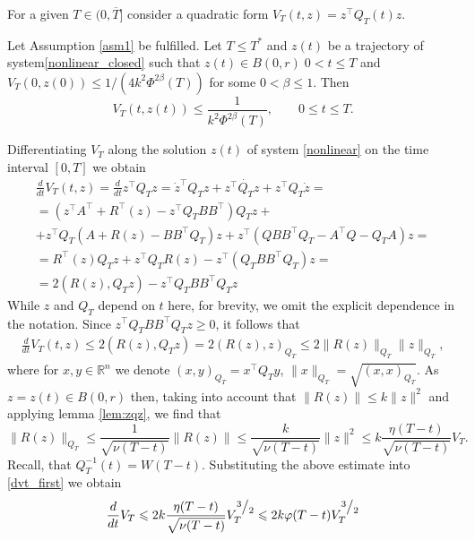\documentclass[../main.tex]{subfiles}
\begin{document}
For a given $T\in (0, \overline{T}]$ consider a quadratic form $V_T(t,z)=z^{\top}Q_T(t)z$.  
\begin{lemma}\label{lem:vest}
 Let Assumption \ref{asm1} be fulfilled. Let $T\leqslant T^*$ and $z(t)$ be a trajectory of system\eqref{nonlinear_closed} such that   $z(t)  \in B(0,r)\;0<t \leqslant T$ and $V_T(0,z(0))\leqslant 1/(4k^2\Phi^{2\beta}(T))$ for some $0<\beta \leqslant 1$. Then 
 $$V_T(t,z(t)) \leqslant \frac{1}{k^2\Phi^{2\beta}(T)}, \qquad 0 \leqslant t \leqslant T. $$
\end{lemma}
\doc
Differentiating $V_T$ along the solution $z(t)$ of  system \eqref{nonlinear}  on the time interval $[0, T]$ we obtain
\begin{gather*}
    \frac{d}{dt}V_T(t,z) = \frac{d}{dt}z^{\top}Q_Tz = \dot{z}^{\top} Q_T z + z^{\top} \dot{Q_T} z + z^{\top} Q_T \dot{z} = \\
    =\left(z^{\top} A^{\top} + R^{\top}(z)- z^{\top} Q_T B B^{\top}\right) Q_T z + \\ +
		z^{\top} Q_T \left(A +R(z) - B B^{\top} Q_T\right)z + z^{\top} \left(Q B B^{\top} Q_T - A^{\top}Q - Q_T A \right) z = \\
    = R^{\top}(z)Q_T z + z^{\top} Q_T R(z) - z^{\top} (Q_T B B^{\top} Q_T) z = \\
    = 2 \left( R(z), Q_Tz \right) - z^{\top} Q_T B B^{\top} Q_T z 
\end{gather*}
While $z$ and $Q_T$  depend on $t$ here, for brevity, we omit the explicit dependence in the notation. Since $z^{\top} Q_T B B^{\top} Q_T z\geqslant 0$, it follows that
\begin{gather}\label{dvt_first}
    \frac{d}{dt}V_T(t,z) \leqslant 2 \left( R(z), Q_T z\right)=2(R(z),z)_{Q_T} \leqslant 2 \| R(z) \|_{Q_T} \| z \|_{Q_T},
\end{gather}
where for $x,y\in \mathbb R^n$ we denote $(x,y)_{Q_T}=x^\top Q_Ty$,  $\| x \|_{Q_T} =\sqrt{(x,x)_{Q_T}}$. As $z = z(t) \in B(0,r)$ then, taking into account that $\|R(z)\| \leqslant k\|z\|^2$  and applying lemma \ref{lem:zqz}, we find that 
\begin{equation}\label{rqr_est}
     \| R(z) \|_{Q_T} \leqslant \frac{1}{\sqrt{\nu(T - t)}} \|R(z)\| \leqslant \frac{k}{\sqrt{\nu(T - t)}}\|z\|^2 \leqslant k \frac{\eta(T-t)}{\sqrt{\nu(T-t)}}V_T.
\end{equation}
Recall, that  $ Q_T^{-1}(t) = W(T-t) $.
Substituting the  above estimate into \eqref{dvt_first} we obtain
\begin{equation}\label{dvt}
    \frac{d}{dt}V_T \leqslant 2 k \frac{\eta(T-t)}{\sqrt{\nu(T-t)}}V_T^{\frc{3}{2}} \leqslant 2k \varphi(T-t) V_T^{\frc{3}{2}}
\end{equation}
\end{document}
